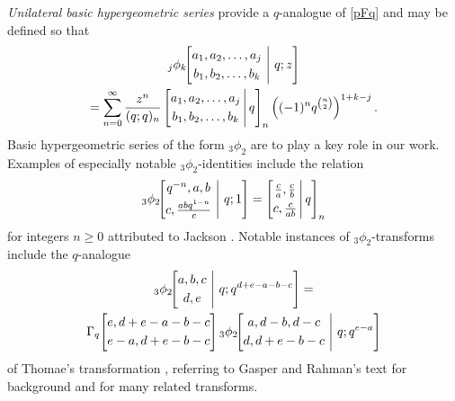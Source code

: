 \documentclass[12pt]{article}
\begin{document}
 \emph{Unilateral basic hypergeometric series} provide a $q$-analogue of \eqref{pFq} and may be defined so that 
\begin{multline*}
 {}_{j}\phi_{k}\!\!\left[ \begin{matrix} 
 a_{1}, a_{2}, \ldots, a_{j} \vspace{1mm}\\ 
 b_{1}, b_{2}, \ldots, b_{k} \end{matrix} \ \Bigg| \ q; z 
 \right] \\ 
 = \sum_{n=0}^{\infty} \frac{z^n}{ (q;q)_{n} } 
 \left[ \begin{matrix} 
 a_{1}, a_{2}, \ldots, a_{j} \vspace{1mm} \\ 
 b_{1}, b_{2}, \ldots, b_{k} \end{matrix} \, \Bigg| \, q \right]_{n} 
 \left( (-1)^{n} q^{\binom{n}{2}} \right)^{1 + k - j}. 
\end{multline*}
 Basic hypergeometric series of the form ${}_{3}\phi_{2}$ are to play a key role in our work. 
 Examples of especially notable ${}_{3}\phi_{2}$-identities include
 the relation 
$$ {}_{3}\phi_{2}\!\!\left[ \begin{matrix} 
 q^{-n}, a, b \vspace{1mm}\\ 
 c, 	 \frac{a b q^{1-n}}{c} \end{matrix} \ \Bigg| \ q; 1 
 \right] 
 = \left[ \begin{matrix} 
 \frac{c}{a}, \frac{c}{b} \vspace{1mm} \\ 
 c, \frac{c}{ab} \end{matrix} \, \Bigg| \, q \right]_{n} 
 $$ for integers $n \geq 0$ attributed to Jackson \cite{Jackson1910Transformations}. 
 Notable instances of ${}_{3}\phi_{2}$-transforms include 
 the $q$-analogue
\begin{multline*} 
 {}_{3}\phi_{2}\!\!\left[ \begin{matrix} 
 a, b, c \vspace{1mm}\\ 
 d, e \end{matrix} \ \Bigg| \ q; q^{d+e-a-b-c} 
 \right] 
 = \\ \Gamma_{q}\!\left[ \begin{matrix} e, d+e-a-b-c \vspace{1mm} \\ 
 e-a, d + e - b - c \end{matrix} \right] 
 {}_{3}\phi_{2}\!\!\left[ \begin{matrix} 
 a, d-b, d-c \vspace{1mm}\\ 
 d, d+e-b-c \end{matrix} \ \Bigg| \ q; q^{e-a} 
 \right] 
\end{multline*} 
 of Thomae's transformation \cite[p. 200]{GasperRahman2004}, referring to Gasper and Rahman's text 
 for background and for many related transforms. 
\end{document}
